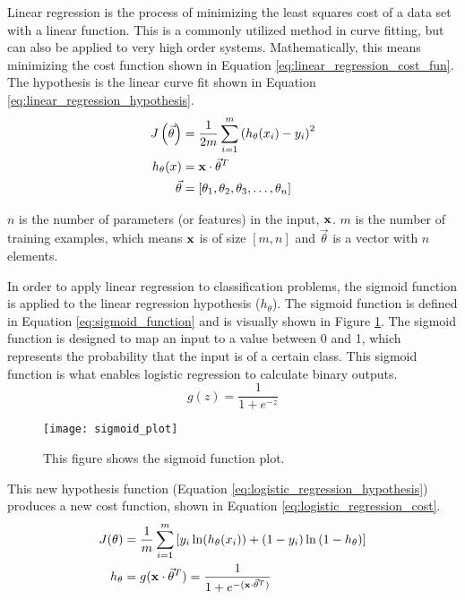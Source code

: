 Linear regression is the process of minimizing the least squares cost of a data set with a linear function.  This is a commonly utilized method in curve fitting, but can also be applied to very high order systems.  Mathematically, this means minimizing the cost function shown in Equation \ref{eq:linear_regression_cost_fun}.  The hypothesis is the linear curve fit shown in Equation \ref{eq:linear_regression_hypothesis}.
\begin{align}
	J\left(\vec{\theta}\right) &= \frac{1}{2m} \sum_{i=1}^{m}{\left(h_{\theta}(x_i) - y_i\right)^2} \label{eq:linear_regression_cost_fun} \\
	h_{\theta}(x) &= \mathbf{x} \cdot \vec{\theta}^T \label{eq:linear_regression_hypothesis} \\
	\vec{\theta} &= [\theta_1, \theta_2, \theta_3, \hdots, \theta_n]
\end{align}

$n$ is the number of parameters (or features) in the input, $\mathbf{x}$.  $m$ is the number of training examples, which means $\mathbf{x}$ is of size $[m, n]$ and $\vec{\theta}$ is a vector with $n$ elements.

In order to apply linear regression to classification problems, the sigmoid function is applied to the linear regression hypothesis ($h_{\theta}$).  The sigmoid function is defined in Equation \ref{eq:sigmoid_function} and is visually shown in Figure \ref{fig:sigmoid_plot}.  The sigmoid function is designed to map an input to a value between 0 and 1, which represents the probability that the input is of a certain class.  This sigmoid function is what enables logistic regression to calculate binary outputs.
\begin{equation} \label{eq:sigmoid_function}
	g(z) = \frac{1}{1+e^{-z}}
\end{equation}

\begin{figure}
	\centering
	\texttt{[image: sigmoid\_plot]}
	\decoRule
	\caption{This figure shows the sigmoid function plot.}
	\label{fig:sigmoid_plot}
\end{figure}

This new hypothesis function (Equation \ref{eq:logistic_regression_hypothesis}) produces a new cost function, shown in Equation \ref{eq:logistic_regression_cost}.
\begin{align}
	J(\theta) &= \frac{1}{m} \sum_{i=1}^{m}{\left[y_i \ln({h_{\theta}(x_i))} + (1-y_i) \ln{(1-h_{\theta}}) \right]}  \label{eq:logistic_regression_cost} \\
	h_{\theta} &= g(\mathbf{x} \cdot \vec{\theta}^T) = \frac{1}{1+e^{-(\mathbf{x} \cdot \vec{\theta}^T)}} \label{eq:logistic_regression_hypothesis}
\end{align}

